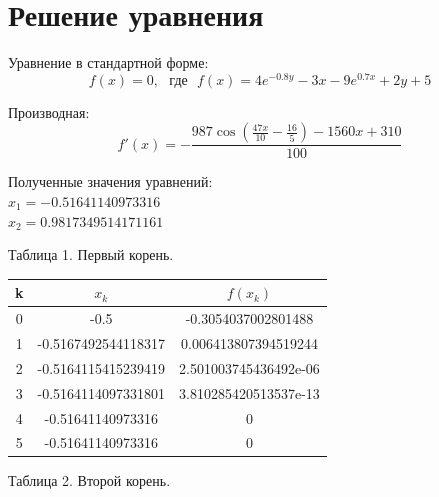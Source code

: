 \documentclass[12pt,a4paper]{article}
\begin{document}
\section{Решение уравнения}
Уравнение в стандартной форме:
\begin{equation*}
	f(x)=0 , \text{  ~где~ } f(x)=4e^{-0.8y}-3x-9e^{0.7x}+2y+5
\end{equation*}


Производная: 
\begin{equation*}
	f'(x)=-\dfrac{987\cos\left(\frac{47x}{10}-\frac{16}{5}\right)-1560x+310}{100}
\end{equation*}

Полученные значения уравнений:\\
$x_1=-0.51641140973316$\\
$x_2=0.9817349514171161$
\newpage
\begin{flushright}
	Таблица 1. Первый корень.
\end{flushright}
\begin{table}[!h]
	\centering
	\begin{tabular}{|c|c|c|}
		\hline
		k & $x_k$               & $f(x_k)$              \\ \hline
		0 & -0.5                & -0.3054037002801488   \\ \hline
		1 & -0.5167492544118317 & 0.006413807394519244  \\ \hline
		2 & -0.5164115415239419 & 2.501003745436492e-06 \\ \hline
		3 & -0.5164114097331801 & 3.810285420513537e-13 \\ \hline
		4 & -0.51641140973316   & 0                     \\ \hline
		5 & -0.51641140973316   & 0                     \\ \hline
	\end{tabular}
\end{table}
\begin{flushright}
	Таблица 2. Второй корень.
\end{flushright}
\end{document}
